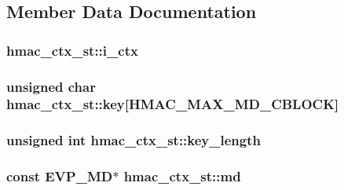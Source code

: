 \subsection{Member Data Documentation}
\subsubsection[{\texorpdfstring{i\+\_\+ctx}{i_ctx}}]{ hmac\+\_\+ctx\+\_\+st\+::i\+\_\+ctx}\hypertarget{structhmac__ctx__st_aa702847295c2c2c40f6093936b89a829}{}\label{structhmac__ctx__st_aa702847295c2c2c40f6093936b89a829}
\subsubsection[{\texorpdfstring{key}{key}}]{\setlength{\rightskip}{0pt plus 5cm}unsigned char hmac\+\_\+ctx\+\_\+st\+::key\mbox{[}{\bf H\+M\+A\+C\+\_\+\+M\+A\+X\+\_\+\+M\+D\+\_\+\+C\+B\+L\+O\+CK}\mbox{]}}\hypertarget{structhmac__ctx__st_a67cdff832dfb8cf2bf7affb9634ef82a}{}\label{structhmac__ctx__st_a67cdff832dfb8cf2bf7affb9634ef82a}
\subsubsection[{\texorpdfstring{key\+\_\+length}{key_length}}]{\setlength{\rightskip}{0pt plus 5cm}unsigned int hmac\+\_\+ctx\+\_\+st\+::key\+\_\+length}\hypertarget{structhmac__ctx__st_a7330fd76130fea0171458261bfc11226}{}\label{structhmac__ctx__st_a7330fd76130fea0171458261bfc11226}
\subsubsection[{\texorpdfstring{md}{md}}]{\setlength{\rightskip}{0pt plus 5cm}const {\bf E\+V\+P\+\_\+\+MD}$\ast$ hmac\+\_\+ctx\+\_\+st\+::md}\hypertarget{structhmac__ctx__st_a9aaff763ed7d862ad49ffa19073deac5}{}\label{structhmac__ctx__st_a9aaff763ed7d862ad49ffa19073deac5}
